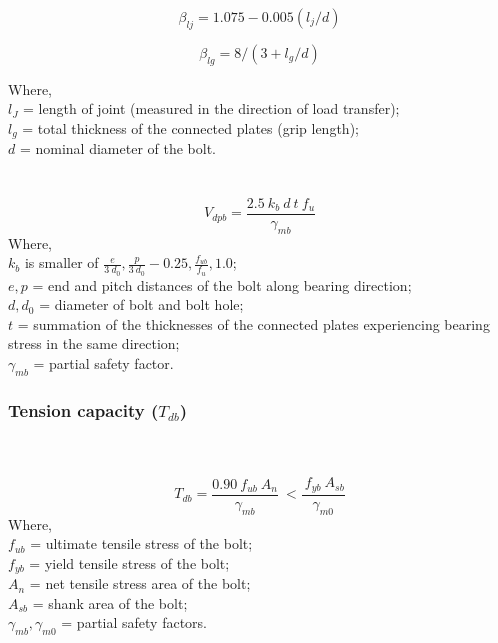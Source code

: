 \documentclass[11.5pt,a4paper,oneside]{report}
\newcounter{subsubsubsection}[subsubsection]
\begin{document}
\begin{Form}
\begin{equation}
	\beta_{lj} = 1.075 - 0.005(l_j/d)
\end{equation}

\begin{equation}
	\beta_{lg} = 8/(3 + l_g/d)
\end{equation}

Where, \\
\indent $l_J$ = length of joint (measured in the direction of load transfer); \\
\indent $l_g$ = total thickness of the connected plates (grip length); \\
\indent $d$ = nominal diameter of the bolt. \\
\qquad \qquad [Reference: Cl. 10.3.4, IS 800:2007] \\ \\
\label{bearing_capacity}
\begin{equation}
	V_{dpb} = \frac{2.5~ k_b~ d~ t~ f_u}{\gamma_{mb}}
\end{equation}
Where, \\
\indent $k_b$ is smaller of $\frac{e}{3~d_0}, \frac{p}{3~d_0} - 0.25, \frac{f_{ub}}{f_u}, 1.0$; \\
\indent $e, p$ = end and pitch distances of the bolt along bearing direction; \\
\indent $d, d_0$ = diameter of bolt and bolt hole; \\
\indent $t$ = summation of the thicknesses of the connected plates experiencing bearing stress in the same direction; \\
\indent $\gamma_{mb}$ = partial safety factor.
\subsubsection{Tension capacity (\boldmath $T_{db}$)}
\label{tension_bearing}
\qquad \qquad [Reference: Cl. 10.3.5, IS 800:2007] \\ \\
\begin{equation}
T_{db} = \frac{0.90~ f_{ub}~ A_n}{\gamma_{mb}}~ < \frac{~f_{yb}~ A_{sb}}{\gamma_{m0}}
\end{equation}
Where, \\
\indent $f_{ub}$ = ultimate tensile stress of the bolt; \\
\indent $f_{yb}$ = yield tensile stress of the bolt; \\
\indent $A_n$ = net tensile stress area of the bolt; \\
\indent $A_{sb}$ = shank area of the bolt; \\
\indent $\gamma_{mb}, \gamma_{m0}$ = partial safety factors. \\

\end{Form}
\end{document}
